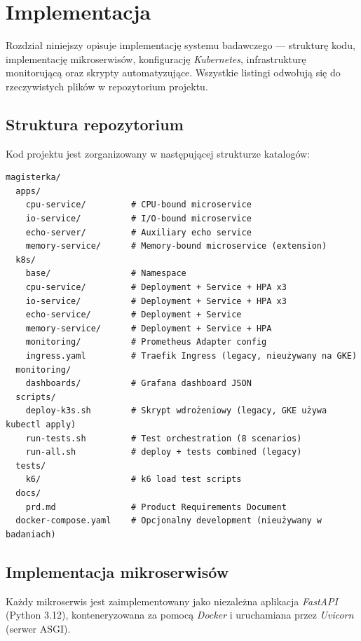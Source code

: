 \chapter{Implementacja}

Rozdział niniejszy opisuje implementację systemu badawczego — strukturę kodu, implementację mikroserwisów, konfigurację \textit{Kubernetes}, infrastrukturę monitorującą oraz skrypty automatyzujące. Wszystkie listingi odwołują się do rzeczywistych plików w repozytorium projektu.

\section{Struktura repozytorium}

Kod projektu jest zorganizowany w następującej strukturze katalogów:

\begin{verbatim}
magisterka/
  apps/
    cpu-service/         # CPU-bound microservice
    io-service/          # I/O-bound microservice
    echo-server/         # Auxiliary echo service
    memory-service/      # Memory-bound microservice (extension)
  k8s/
    base/                # Namespace
    cpu-service/         # Deployment + Service + HPA x3
    io-service/          # Deployment + Service + HPA x3
    echo-service/        # Deployment + Service
    memory-service/      # Deployment + Service + HPA
    monitoring/          # Prometheus Adapter config
    ingress.yaml         # Traefik Ingress (legacy, nieużywany na GKE)
  monitoring/
    dashboards/          # Grafana dashboard JSON
  scripts/
    deploy-k3s.sh        # Skrypt wdrożeniowy (legacy, GKE używa kubectl apply)
    run-tests.sh         # Test orchestration (8 scenarios)
    run-all.sh           # deploy + tests combined (legacy)
  tests/
    k6/                  # k6 load test scripts
  docs/
    prd.md               # Product Requirements Document
  docker-compose.yaml    # Opcjonalny development (nieużywany w badaniach)
\end{verbatim}

\section{Implementacja mikroserwisów}

Każdy mikroserwis jest zaimplementowany jako niezależna aplikacja \textit{FastAPI} (Python 3.12), konteneryzowana za pomocą \textit{Docker} i uruchamiana przez \textit{Uvicorn} (serwer ASGI).

